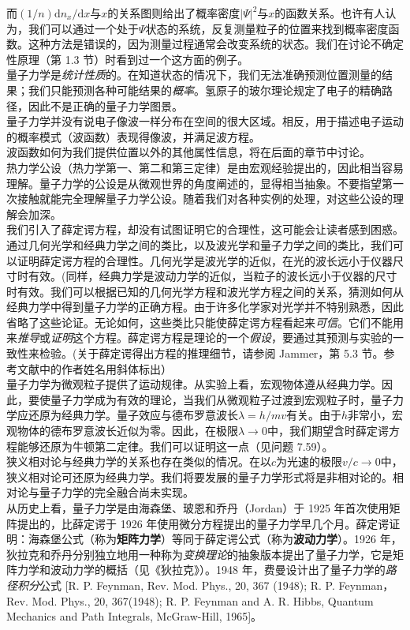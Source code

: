 	而$\left(1/n\right) \mathrm{d}n_x / \mathrm{d}x$与$x$的关系图则给出了概率密度$\left|\Psi\right|^2$与$x$的函数关系。也许有人认为，我们可以通过一个处于$\Psi$状态的系统，反复测量粒子的位置来找到概率密度函数。这种方法是错误的，因为测量过程通常会改变系统的状态。我们在讨论不确定性原理（第 1.3 节）时看到过一个这方面的例子。\\
	\indent 量子力学是\textit{统计性质}的。在知道状态的情况下，我们无法准确预测位置测量的结果；我们只能预测各种可能结果的\textit{概率}。氢原子的玻尔理论规定了电子的精确路径，因此不是正确的量子力学图景。\\
	\indent 量子力学并没有说电子像波一样分布在空间的很大区域。相反，用于描述电子运动的概率模式（波函数）表现得像波，并满足波方程。\\
	\indent 波函数如何为我们提供位置以外的其他属性信息，将在后面的章节中讨论。\\
	\indent 热力学公设（热力学第一、第二和第三定律）是由宏观经验提出的，因此相当容易理解。量子力学的公设是从微观世界的角度阐述的，显得相当抽象。不要指望第一次接触就能完全理解量子力学公设。随着我们对各种实例的处理，对这些公设的理解会加深。\\
	\indent 我们引入了薛定谔方程，却没有试图证明它的合理性，这可能会让读者感到困惑。通过几何光学和经典力学之间的类比，以及波光学和量子力学之间的类比，我们可以证明薛定谔方程的合理性。几何光学是波光学的近似，在光的波长远小于仪器尺寸时有效。(同样，经典力学是波动力学的近似，当粒子的波长远小于仪器的尺寸时有效。我们可以根据已知的几何光学方程和波光学方程之间的关系，猜测如何从经典力学中得到量子力学的正确方程。由于许多化学家对光学并不特别熟悉，因此省略了这些论证。无论如何，这些类比只能使薛定谔方程看起来\textit{可信}。它们不能用来\textit{推导}或\textit{证明}这个方程。薛定谔方程是理论的一个\textit{假设}，要通过其预测与实验的一致性来检验。(关于薛定谔得出方程的推理细节，请参阅 Jammer，第 5.3 节。参考文献中的作者姓名用斜体标出）\\
	\indent 量子力学为微观粒子提供了运动规律。从实验上看，宏观物体遵从经典力学。因此，要使量子力学成为有效的理论，当我们从微观粒子过渡到宏观粒子时，量子力学应还原为经典力学。量子效应与德布罗意波长$\lambda=h/mv$有关。由于$h$非常小，宏观物体的德布罗意波长近似为零。因此，在极限$\lambda \rightarrow 0$中，我们期望含时薛定谔方程能够还原为牛顿第二定律。我们可以证明这一点（见问题 7.59）。\\
	\indent 狭义相对论与经典力学的关系也存在类似的情况。在以$c$为光速的极限$v/c \rightarrow 0$中，狭义相对论可还原为经典力学。我们将要发展的量子力学形式将是非相对论的。相对论与量子力学的完全融合尚未实现。\\
	\indent 从历史上看，量子力学是由海森堡、玻恩和乔丹（Jordan）于 1925 年首次使用矩阵提出的，比薛定谔于 1926 年使用微分方程提出的量子力学早几个月。薛定谔证明：海森堡公式（称为\textbf{矩阵力学}）等同于薛定谔公式（称为\textbf{波动力学}）。1926 年，狄拉克和乔丹分别独立地用一种称为\textit{变换理论}的抽象版本提出了量子力学，它是矩阵力学和波动力学的概括（见《狄拉克》）。1948 年，费曼设计出了量子力学的\textit{路径积分}公式 [R. P. Feynman, Rev. Mod. Phys., 20, 367 (1948); R. P. Feynman，Rev. Mod. Phys., 20, 367(1948); R. P. Feynman and A. R. Hibbs, Quantum Mechanics and Path Integrals, McGraw-Hill, 1965]。
	

